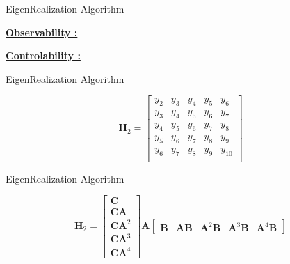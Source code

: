 \documentclass[aspectratio=169, usenames, dvipsnames]{beamer}
\begin{document}
\begin{frame}{EigenRealization Algorithm}
  \vfill

  \centering

  \underline{\textbf{Observability :}} 

  \vfill

  \underline{\textbf{Controlability :}} 

  \vfill
\end{frame}

\begin{frame}{EigenRealization Algorithm}
  \vfill

  \Large
  \[
  \bm{H}_2
  =
  \begin{bmatrix}
    y_2 & y_3 & y_4 & y_5 & y_6 \\
    y_3 & y_4 & y_5 & y_6 & y_7 \\
    y_4 & y_5 & y_6 & y_7 & y_8 \\
    y_5 & y_6 & y_7 & y_8 & y_9 \\
    y_6 & y_7 & y_8 & y_9 & y_{10} \\
  \end{bmatrix}
  \]

  \vfill
\end{frame}


\begin{frame}{EigenRealization Algorithm}
  \vfill

  \Large
  \[
  \bm{H}_2
  =
  \begin{bmatrix}
    \bm{C} \\ \bm{CA} \\ \bm{CA}^2 \\ \bm{CA}^3 \\ \bm{CA}^4
  \end{bmatrix}
  \bm{A}
  \begin{bmatrix}
    \bm{B} & \bm{AB} & \bm{A}^2 \bm{B} & \bm{A}^3 \bm{B} & \bm{A}^4 \bm{B}
  \end{bmatrix}
  \]

  \vfill
\end{frame}
\end{document}
